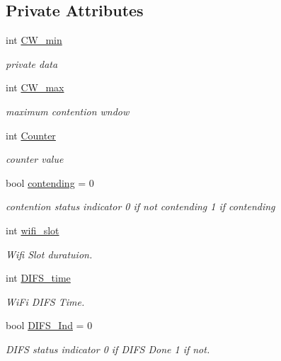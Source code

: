 \subsection*{Private Attributes}
\begin{DoxyCompactItemize}
\item 
int \hyperlink{classAP_a02a0d02d7725c2b4ca51a3d6a88e677e}{C\-W\-\_\-min}
\begin{DoxyCompactList}\small\item\em private data \end{DoxyCompactList}\item 
int \hyperlink{classAP_a3351a0a344c4a96a5a185aea2609fa7c}{C\-W\-\_\-max}
\begin{DoxyCompactList}\small\item\em maximum contention wndow \end{DoxyCompactList}\item 
int \hyperlink{classAP_a4cf433d4becdf9cb836d170133d9d478}{Counter}
\begin{DoxyCompactList}\small\item\em counter value \end{DoxyCompactList}\item 
bool \hyperlink{classAP_afe722094c1dea7972332a788411cc488}{contending} = 0
\begin{DoxyCompactList}\small\item\em contention status indicator 0 if not contending 1 if contending \end{DoxyCompactList}\item 
int \hyperlink{classAP_a48aa019a03aefd3ee980a9112441234b}{wifi\-\_\-slot}
\begin{DoxyCompactList}\small\item\em Wifi Slot duratuion. \end{DoxyCompactList}\item 
int \hyperlink{classAP_a41453568719c530c6a7376273c02a6fa}{D\-I\-F\-S\-\_\-time}
\begin{DoxyCompactList}\small\item\em Wi\-Fi D\-I\-F\-S Time. \end{DoxyCompactList}\item 
bool \hyperlink{classAP_ae9749297d96e52a95a4f52f795127f8e}{D\-I\-F\-S\-\_\-\-Ind} = 0
\begin{DoxyCompactList}\small\item\em D\-I\-F\-S status indicator 0 if D\-I\-F\-S Done 1 if not. \end{DoxyCompactList}\item 

\end{DoxyCompactItemize}
